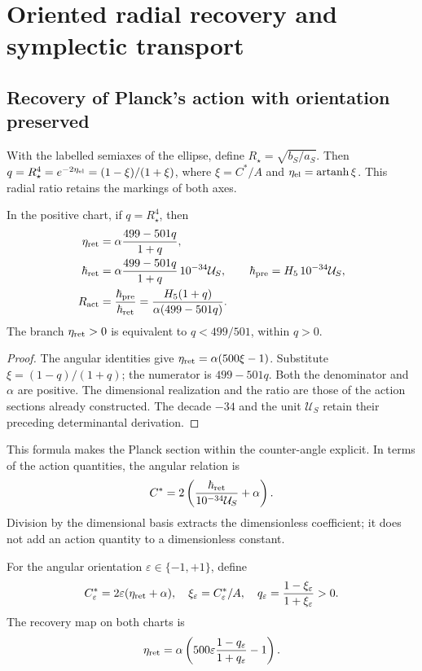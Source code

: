 \section{Oriented radial recovery and symplectic transport}
\subsection{Recovery of Planck's action with orientation preserved}

With the labelled semiaxes of the ellipse, define
\(R_\star=\sqrt{b_S/a_S}\). Then
\(q=R_\star^4=e^{-2\eta_{\rm el}}=(1-\xi)/(1+\xi)\),
where \(\xi=C^*/A\) and \(\eta_{\rm el}=\operatorname{artanh}\xi\).
This radial ratio retains the markings of both axes.

\begin{theorem}
\label{rec:thm:accion}
In the positive chart, if \(q=R_\star^4\), then
\begin{align}
 \eta_{\rm ret}&=\alpha\frac{499-501q}{1+q},\label{rec:eq:eta-radio}\\
 \hbar_{\rm ret}&=\alpha\frac{499-501q}{1+q}\,10^{-34}\mathcal U_S,
 \qquad\hbar_{\rm pre}=H_5\,10^{-34}\mathcal U_S,\label{rec:eq:planck-radio}\\
 R_{\rm act}&=\frac{\hbar_{\rm pre}}{\hbar_{\rm ret}}
 =\frac{H_5(1+q)}{\alpha(499-501q)}.\label{rec:eq:ratio-radio}
\end{align}
The branch \(\eta_{\rm ret}>0\) is equivalent to \(q<499/501\), within \(q>0\).
\end{theorem}
\begin{proof}
The angular identities give \(\eta_{\rm ret}=\alpha(500\xi-1)\). Substitute \(\xi=(1-q)/(1+q)\); the numerator is \(499-501q\). Both the denominator and \(\alpha\) are positive. The dimensional realization and the ratio are those of the action sections already constructed. The decade \(-34\) and the unit \(\mathcal U_S\) retain their preceding determinantal derivation.
\end{proof}

This formula makes the Planck section within the counter-angle explicit. In terms of the action quantities, the angular relation is
\[
 C^*=2\left(\frac{\hbar_{\rm ret}}{10^{-34}\mathcal U_S}+\alpha\right).
\]
Division by the dimensional basis extracts the dimensionless coefficient; it does not add an action quantity to a dimensionless constant.

For the angular orientation \(\varepsilon\in\{-1,+1\}\), define
\[
 C^*_{\varepsilon}=2\varepsilon(\eta_{\rm ret}+\alpha),\quad
 \xi_\varepsilon=C^*_{\varepsilon}/A,\quad
 q_\varepsilon=\frac{1-\xi_\varepsilon}{1+\xi_\varepsilon}>0.
\]
The recovery map on both charts is
\begin{equation}
 \eta_{\rm ret}=\alpha\left(500\varepsilon
        \frac{1-q_\varepsilon}{1+q_\varepsilon}-1\right).
 \label{rec:eq:eta-orientada}
\end{equation}


